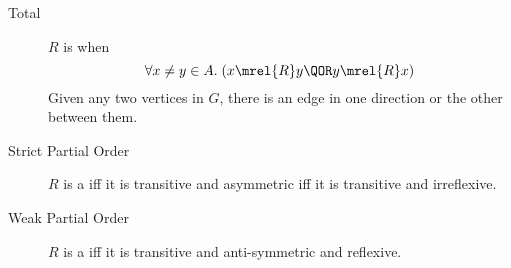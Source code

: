\documentclass[handout]{mcs}
\begin{document}
\begin{pagesidebar}[to \textheight]
\begin{description}
\item[Total] $R$ is  when
\[
 \forall x \neq y \in A. \; (x \mrel{R} y \QOR y \mrel{R} x)
\]
Given any two vertices in $G$, there is an edge in one direction or the
other between them.

\item[Strict Partial Order] $R$ is a  iff
  it is transitive and asymmetric iff it is transitive and
  irreflexive.

\item[Weak Partial Order] $R$ is a  iff it is
  transitive and anti-symmetric and reflexive.

\end{description}
\end{pagesidebar}
\fi
\end{document}
